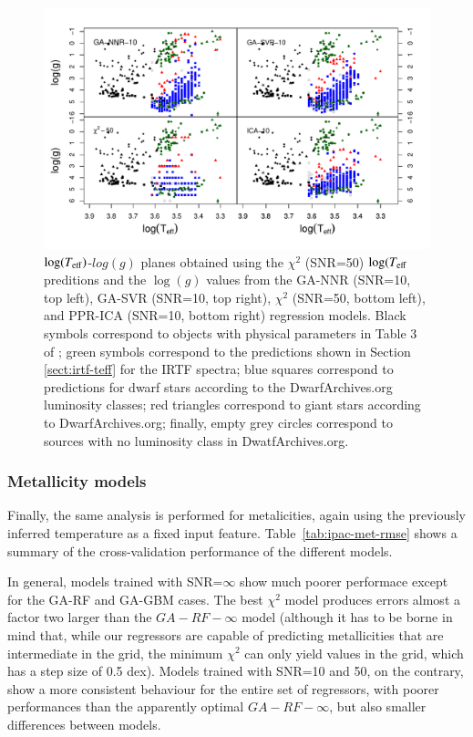 \begin{figure}
 \begin{center}
 \includegraphics[width=\textwidth]{figs/ipac-teff-logg.pdf}

\caption{$\log(T_{\rm eff})$-$log(g)$ planes obtained using the $\chi^2$ (SNR=50)
$\log(T_{\rm eff}$ preditions and the $\log(g)$ values from the GA-NNR
(SNR=10, top left), GA-SVR (SNR=10, top right), $\chi^2$ (SNR=50,
bottom left), and PPR-ICA (SNR=10, bottom right) regression
models. Black symbols correspond to objects with physical parameters
in Table 3 of \cite{cesetti}; green symbols correspond to the
predictions shown in Section \ref{sect:irtf-teff} for the IRTF
spectra; blue squares correspond to predictions for dwarf stars
according to the DwarfArchives.org luminosity classes; red triangles
correspond to giant stars according to DwarfArchives.org; finally,
empty grey circles correspond to sources with no luminosity class in
DwatfArchives.org.}

\label{fig:teffvsloggIPAC}
 \end{center}
\end{figure}

\subsubsection{Metallicity models} 

Finally, the same analysis is performed for metalicities, again using
the previously inferred temperature as a fixed input feature.
Table~\ref{tab:ipac-met-rmse} shows a summary of the cross-validation
performance of the different models.

In general, models trained with SNR=$\infty$ show much poorer 
performace except for the GA-RF and GA-GBM cases. The best $\chi^2$ 
model produces errors almost a factor two larger than the 
$GA-RF-\infty$ model (although it has to be borne in mind that, while 
our regressors are capable of predicting metallicities that are 
intermediate in the grid, the minimum $\chi^2$ can only yield values 
in the grid, which has a step size of 0.5 dex). Models trained with 
SNR=10 and 50, on the contrary,  show a more consistent behaviour for 
the entire set of regressors, with poorer performances than the 
apparently optimal $GA-RF-\infty$, but also smaller differences between models. 


